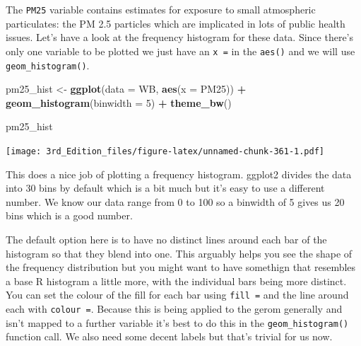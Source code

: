 \documentclass[
]{book}
\newenvironment{Shaded}{\begin{snugshade}}{\end{snugshade}}
\newcommand{\DataTypeTok}[1]{\textcolor[rgb]{0.13,0.29,0.53}{#1}}
\newcommand{\DecValTok}[1]{\textcolor[rgb]{0.00,0.00,0.81}{#1}}
\newcommand{\FloatTok}[1]{\textcolor[rgb]{0.00,0.00,0.81}{#1}}
\newcommand{\KeywordTok}[1]{\textcolor[rgb]{0.13,0.29,0.53}{\textbf{#1}}}
\newcommand{\NormalTok}[1]{#1}
\newcommand{\OperatorTok}[1]{\textcolor[rgb]{0.81,0.36,0.00}{\textbf{#1}}}
\newcommand{\OtherTok}[1]{\textcolor[rgb]{0.56,0.35,0.01}{#1}}
\newcommand{\StringTok}[1]{\textcolor[rgb]{0.31,0.60,0.02}{#1}}
\begin{document}
\begin{Shaded}
\end{Shaded}

The \texttt{PM25} variable contains estimates for exposure to small atmospheric particulates: the PM 2.5 particles which are implicated in lots of public health issues. Let's have a look at the frequency histogram for these data. Since there's only one variable to be plotted we just have an \texttt{x\ =} in the \texttt{aes()} and we will use \texttt{geom\_histogram()}.

\begin{Shaded}
\begin{Highlighting}[]
\NormalTok{pm25_hist <-}\StringTok{ }\KeywordTok{ggplot}\NormalTok{(}\DataTypeTok{data =}\NormalTok{ WB, }\KeywordTok{aes}\NormalTok{(}\DataTypeTok{x =}\NormalTok{ PM25)) }\OperatorTok{+}
\StringTok{        }\KeywordTok{geom_histogram}\NormalTok{(}\DataTypeTok{binwidth =} \DecValTok{5}\NormalTok{) }\OperatorTok{+}
\StringTok{        }\KeywordTok{theme_bw}\NormalTok{()}

\NormalTok{pm25_hist}
\end{Highlighting}
\end{Shaded}

\texttt{[image: 3rd\_Edition\_files/figure-latex/unnamed-chunk-361-1.pdf]}

This does a nice job of plotting a frequency histogram. ggplot2 divides the data into 30 bins by default which is a bit much but it's easy to use a different number. We know our data range from 0 to 100 so a binwidth of 5 gives us 20 bins which is a good number.

The default option here is to have no distinct lines around each bar of the histogram so that they blend into one. This arguably helps you see the shape of the frequency distribution but you might want to have somethign that resembles a base R histogram a little more, with the individual bars being more distinct. You can set the colour of the fill for each bar using \texttt{fill\ =} and the line around each with \texttt{colour\ =}. Because this is being applied to the gerom generally and isn't mapped to a further variable it's best to do this in the \texttt{geom\_histogram()} function call. We also need some decent labels but that's trivial for us now.
\end{document}
